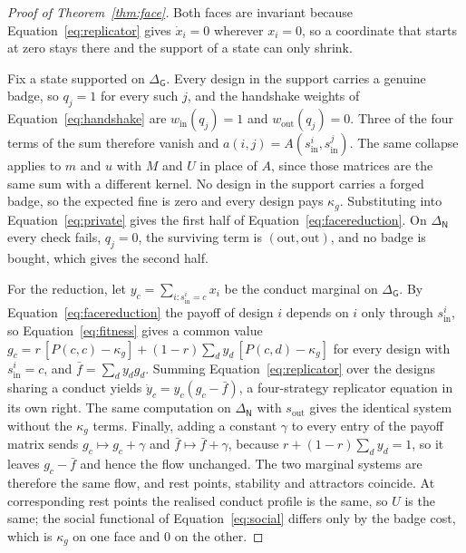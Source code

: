 \documentclass[11pt,a4paper]{article}
\theoremstyle{definition}
\begin{document}
\begin{proof}[Proof of Theorem~\ref{thm:face}]
Both faces are invariant because Equation~\eqref{eq:replicator} gives
$\dot{x}_i = 0$ wherever $x_i = 0$, so a coordinate that starts at zero stays
there and the support of a state can only shrink.

Fix a state supported on $\Delta_{\mathsf{G}}$. Every design in the support
carries a genuine badge, so $q_j = 1$ for every such $j$, and the handshake
weights of Equation~\eqref{eq:handshake} are $w_{\mathrm{in}}(q_j) = 1$ and
$w_{\mathrm{out}}(q_j) = 0$. Three of the four terms of the sum therefore
vanish and $a(i,j) = A(s^{i}_{\mathrm{in}}, s^{j}_{\mathrm{in}})$. The same
collapse applies to $m$ and $u$ with $M$ and $U$ in place of $A$, since those
matrices are the same sum with a different kernel. No design in the support
carries a forged badge, so the expected fine is zero and every design pays
$\kappa_g$. Substituting into Equation~\eqref{eq:private} gives the first half
of Equation~\eqref{eq:facereduction}. On $\Delta_{\mathsf{N}}$ every check
fails, $q_j = 0$, the surviving term is $(\mathrm{out}, \mathrm{out})$, and no
badge is bought, which gives the second half.

For the reduction, let $y_c = \sum_{i : s^{i}_{\mathrm{in}} = c} x_i$ be the
conduct marginal on $\Delta_{\mathsf{G}}$. By
Equation~\eqref{eq:facereduction} the payoff of design $i$ depends on $i$ only
through $s^{i}_{\mathrm{in}}$, so Equation~\eqref{eq:fitness} gives a common
value $g_c = r\,[P(c,c) - \kappa_g] + (1-r)\sum_d y_d\,[P(c,d) - \kappa_g]$ for
every design with $s^{i}_{\mathrm{in}} = c$, and $\bar{f} = \sum_d y_d g_d$.
Summing Equation~\eqref{eq:replicator} over the designs sharing a conduct
yields $\dot{y}_c = y_c (g_c - \bar{f})$, a four-strategy replicator equation
in its own right. The same computation on $\Delta_{\mathsf{N}}$ with
$s_{\mathrm{out}}$ gives the identical system without the $\kappa_g$ terms.
Finally, adding a constant $\gamma$ to every entry of the payoff matrix sends
$g_c \mapsto g_c + \gamma$ and $\bar{f} \mapsto \bar{f} + \gamma$, because
$r + (1-r)\sum_d y_d = 1$, so it leaves $g_c - \bar{f}$ and hence the flow
unchanged. The two marginal systems are therefore the same flow, and rest
points, stability and attractors coincide. At corresponding rest points the
realised conduct profile is the same, so $U$ is the same; the social functional
of Equation~\eqref{eq:social} differs only by the badge cost, which is
$\kappa_g$ on one face and $0$ on the other.
\end{proof}
\end{document}
